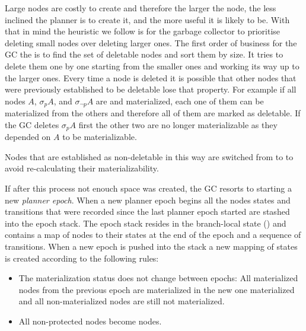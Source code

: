 %
%
Large nodes are costly to create and therefore the larger the node,
the less inclined the planner is to create it, and the more useful it
is likely to be. With that in mind the heuristic we follow is for the
garbage collector to prioritise deleting small nodes over deleting
larger ones. The first order of business for the GC the is to find the
set of deletable nodes and sort them by size. It tries to delete them
one by one starting from the smaller ones and working its way up to
the larger ones. Every time a node is deleted it is possible that
other nodes that were previously established to be deletable lose that
property. For example if all nodes \(A\), \(\sigma_p A\), and
\(\sigma_{\neg p} A\) are  and materialized, each one of
them can be materialized from the others and therefore all of them are
marked as deletable. If the GC deletes \(\sigma_p A\) first the other
two are no longer materializable as they depended on \(A\) to be
materializable.


Nodes that are established as non-deletable in this way are switched
from  to  to avoid re-calculating their
materializability.

If after this process not enouch space was created, the GC resorts to
starting a new \emph{planner epoch}. When a new planner epoch begins all
the nodes states and transitions that were recorded since the last
planner epoch started are stashed into the epoch stack. The epoch
stack resides in the branch-local state () and contains a map
of nodes to their states at the end of the epoch and a sequence of
transitions. When a new epoch is pushed into the stack a new mapping
of states is created according to the following rules:

\begin{itemize}
\item The materialization status does not change between epochs: All
  materialized nodes from the previous epoch are materialized in the
  new one materialized and all non-materialized nodes are still not
  materialized.
\item All non-protected  nodes become 
  nodes.
\end{itemize}

